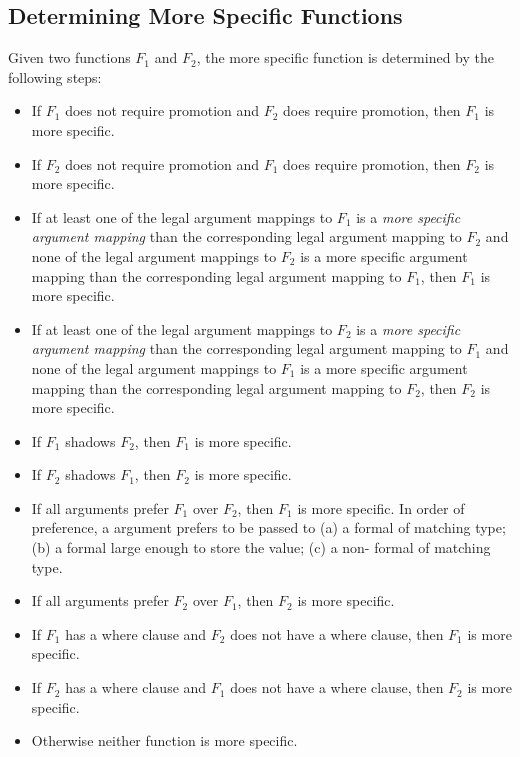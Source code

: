 \subsection{Determining More Specific Functions}
\label{Determining_More_Specific_Functions}

Given two functions $F_1$ and $F_2$, the more specific function is
determined by the following steps:
\begin{itemize}
\item If $F_1$ does not require promotion and $F_2$ does require promotion, then $F_1$ is more specific.
\item If $F_2$ does not require promotion and $F_1$ does require promotion, then $F_2$ is more specific.
\item
If at least one of the legal argument mappings to $F_1$ is a {\em more
specific argument mapping} than the corresponding legal argument
mapping to $F_2$ and none of the legal argument mappings to $F_2$ is a
more specific argument mapping than the corresponding legal argument
mapping to $F_1$, then $F_1$ is more specific.
\item
If at least one of the legal argument mappings to $F_2$ is a {\em more
specific argument mapping} than the corresponding legal argument
mapping to $F_1$ and none of the legal argument mappings to $F_1$ is a
more specific argument mapping than the corresponding legal argument
mapping to $F_2$, then $F_2$ is more specific.
\item If $F_1$ shadows $F_2$, then $F_1$ is more specific.
\item If $F_2$ shadows $F_1$, then $F_2$ is more specific.
\item If all  arguments prefer $F_1$ over $F_2$, then $F_1$ is more specific.  In order of preference, a  argument prefers to be passed to (a) a  formal of matching type; (b) a  formal large enough to store the  value; (c) a non- formal of matching type.
\item If all  arguments prefer $F_2$ over $F_1$, then $F_2$ is more specific.
\item If $F_1$ has a where clause and $F_2$ does not have a where clause, then $F_1$ is more specific.
\item If $F_2$ has a where clause and $F_1$ does not have a where clause, then $F_2$ is more specific.
\item Otherwise neither function is more specific.
\end{itemize}

